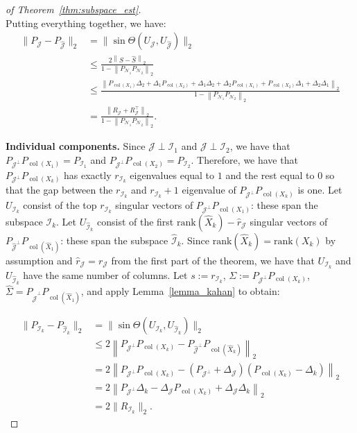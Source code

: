 \documentclass{amsart}
\DeclareMathOperator*{\col}{col}
\newcommand{\Ncal}{\mathcal{N}}
\newcommand{\Jcal}{\mathcal{J}}
\newcommand{\Ical}{\mathcal{I}}
\begin{document}
\begin{proof}[of Theorem~\ref{thm:subspace_est}]
\begin{equation*}
    \end{equation*}
    Putting everything together, we have:
    \begin{align*}
        \| P_{\Jcal} - P_{\widehat{\Jcal}} \|_2 &= \| \sin\Theta(U_{\Jcal}, U_{\widehat{\Jcal}} )\|_2 \\ 
        &\leq \frac{{2}\left\| S- \widehat{S}\right\|_2}{1-\left\|P_{\Ncal_1} P_{\Ncal_2}\right\|_2} \\
        &\leq  \frac{  {}\left\|P_{\col(X_1)} \Delta_2 + \Delta_1 P_{\col(X_2)} + \Delta_1 \Delta_2 + \Delta_2 P_{\col(X_1)}  + P_{\col(X_2)} \Delta_1  +  \Delta_2\Delta_1\right\|_2}{1-\left\|P_{\Ncal_1} P_{\Ncal_2}\right\|_2} \\
        &= \frac{ {}\left\|R_{\Jcal} + R_{\Jcal}^\top\right\|_2}{1-\left\|P_{\Ncal_1} P_{\Ncal_2}\right\|_2}.
        \end{align*} 

        \noindent
        \textbf{Individual components.} Since $\Jcal \perp \Ical_1$ and $\Jcal \perp \Ical_2$, we have that $P_{\Jcal^\perp} P_{\col(X_1)} = P_{\Ical_1}$ and $P_{\Jcal^\perp} P_{\col(X_2)} = P_{\Ical_2}$. 
        Therefore, we have that $P_{\Jcal^\perp} P_{\col(X_k)}$ has exactly $r_{\Ical_k}$ eigenvalues equal to $1$ and the rest equal to $0$ so that the gap between the $r_{\Ical_k}$ and $r_{\Ical_k}+1$ eigenvalue of $P_{\Jcal^\perp} P_{\col(X_k)}$ is one. Let $U_{{\Ical}_k}$ consist of the top $r_{\Ical_k}$ singular vectors of $P_{\Jcal^\perp} P_{\col(X_1)}$: these span the subspace ${\Ical_k}$. Let ${U}_{\widehat{\Ical}_k}$ consist of the first $\mathrm{rank}(\widehat{X}_k) - \widehat{r}_{\Jcal}$ singular vectors of $P_{\widehat{\Jcal}^\perp} P_{\col(\widehat{X}_1)}$: these span the subspace $\widehat{\Ical}_k$. Since $\mathrm{rank}(\widehat{X}_k) = \mathrm{rank}(X_k)$ by assumption and $\widehat{r}_{\Jcal} ={r}_{\Jcal}$ from the first part of the theorem, we have that $U_{{\Ical}_k}$ and $U_{\widehat{\Ical}_k}$ have the same number of columns. Let $s :=  r_{\Ical_k}$, $\Sigma:= P_{\Jcal^\perp} P_{\col(X_k)}$, $\widehat{\Sigma} = P_{\widehat{\Jcal}^\perp} P_{\col(\widehat{X}_1)}$, and apply Lemma~\ref{lemma_kahan} to obtain:        
        
        \begin{align*}
            \| P_{\Ical_k} - P_{\widehat{\Ical}_k}\|_2 & =  \|\sin \Theta(U_{{\Ical_k}}, U_{\widehat{\Ical}_k}) \|_2 \\
            &\leq{2\left\|P_{\Jcal^\perp} P_{\col(X_k)} - P_{\widehat{\Jcal}^\perp} P_{\col(\widehat{X}_k)}\right\|_2} \\
            &{= 2\left\|P_{\Jcal^\perp} P_{\col(X_k)} - (P_{\Jcal^\perp} + \Delta_{\Jcal})(P_{\col (X_k)} - \Delta_k)\right\|_2}\\
            &{= 2\left\|P_{{\Jcal}^\perp} \Delta_k - \Delta_{\Jcal} P_{\col(X_k)} + \Delta_{\Jcal} \Delta_k \right\|_2} \\
            &{=2\|R_{\Ical_k}\|_2.}
        \end{align*}
\end{proof}
\end{document}
